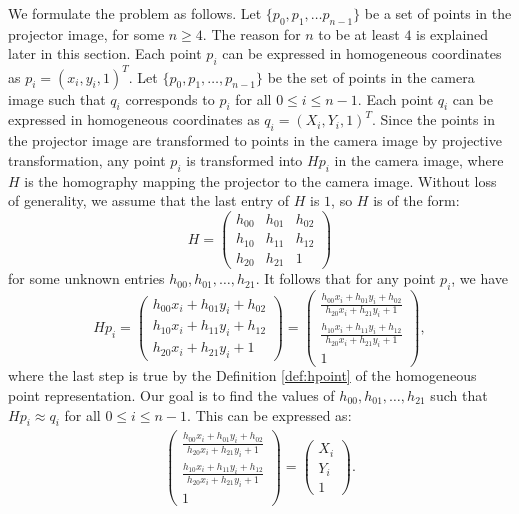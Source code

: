 \documentclass[11pt, oneside, reqno]{book}
\begin{document}
We formulate the problem as follows. Let $\{p_0, p_1, \dots p_{n-1}\}$ be a set of points in the projector image, for some $n \ge 4$. The reason for $n$ to be at least $4$ is explained later in this section. Each point $p_i$ can be expressed in homogeneous coordinates as $p_i = \left(x_i, y_i, 1\right)^T$. Let $\{p_0, p_1, \dots, p_{n-1}\}$ be the set of points in the camera image such that $q_i$ corresponds to $p_i$ for all $0 \le i \le n-1$. Each point $q_i$ can be expressed in homogeneous coordinates as $q_i = \left(X_i, Y_i, 1\right)^T$. Since the points in the projector image are transformed to points in the camera image by projective transformation, any point $p_i$ is transformed into $Hp_i$ in the camera image, where $H$ is the homography mapping the projector to the camera image. Without loss of generality, we assume that the last entry of $H$ is $1$, so $H$ is of the form:
\[ 
H = \begin{pmatrix}
h_{00} & h_{01} & h_{02} \\
h_{10} & h_{11} & h_{12} \\
h_{20} & h_{21} & 1
\end{pmatrix}
\]
for some unknown entries $ h_{00}, h_{01}, \dots, h_{21} $.
It follows that for any point $p_i$, we have 
\[
Hp_i = \begin{pmatrix} 
h_{00}x_i + h_{01}y_i + h_{02} \\[3 pt]
h_{10}x_i + h_{11}y_i + h_{12} \\[3 pt]
h_{20}x_i + h_{21}y_i + 1
\end{pmatrix}
= \begin{pmatrix}
\frac{h_{00}x_i + h_{01}y_i + h_{02}}{h_{20}x_i + h_{21}y_i + 1} \\[5 pt]
\frac{h_{10}x_i + h_{11}y_i + h_{12}}{h_{20}x_i + h_{21}y_i + 1} \\[3 pt]
1
\end{pmatrix},
\]
where the last step is true by the Definition \ref{def:hpoint} of the homogeneous point representation.
Our goal is to find the values of $h_{00}, h_{01}, \dots, h_{21}$ such that $Hp_i \approx q_i$ for all $0 \le i \le n-1$. This can be expressed as:
\begin{align}
\begin{pmatrix}
\frac{h_{00}x_i + h_{01}y_i + h_{02}}{h_{20}x_i + h_{21}y_i + 1} \\[5 pt]
\frac{h_{10}x_i + h_{11}y_i + h_{12}}{h_{20}x_i + h_{21}y_i + 1} \\[3 pt]
1
\end{pmatrix}
= \begin{pmatrix}
X_i \\ Y_i \\ 1
\end{pmatrix}. \label{eq:Hp/Hp_2=q}
\end{align}
\end{document}
